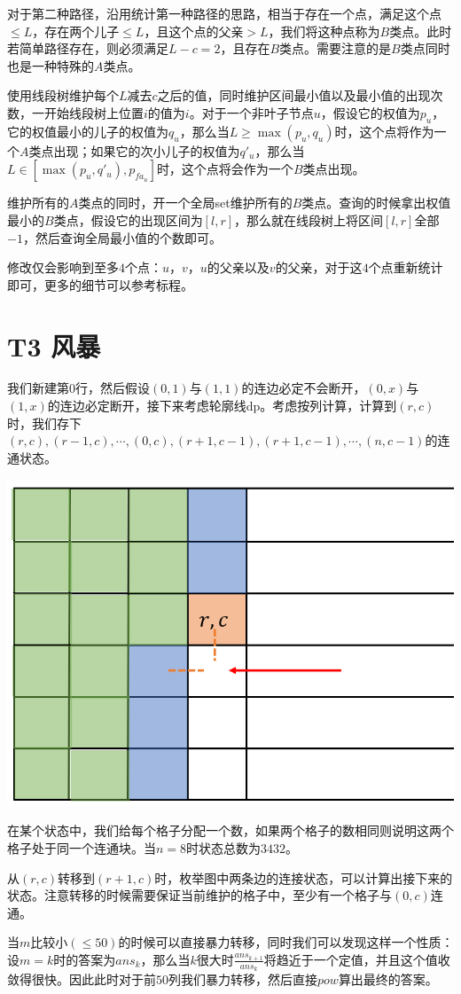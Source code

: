 \documentclass[12pt]{article}
\begin{document}
对于第二种路径，沿用统计第一种路径的思路，相当于存在一个点，满足这个点$\leq L$，存在两个儿子$\leq L$，且这个点的父亲$>L$，我们将这种点称为$B$类点。此时若简单路径存在，则必须满足$L - c = 2$，且存在$B$类点。需要注意的是$B$类点同时也是一种特殊的$A$类点。

使用线段树维护每个$L$减去$c$之后的值，同时维护区间最小值以及最小值的出现次数，一开始线段树上位置$i$的值为$i$。对于一个非叶子节点$u$，假设它的权值为$p_u$，它的权值最小的儿子的权值为$q_u$，那么当$L\geq \max(p_u, q_u)$时，这个点将作为一个$A$类点出现；如果它的次小儿子的权值为$q'_u$，那么当$L\in[\max(p_u, q'_u), p_{fa_u}]$时，这个点将会作为一个$B$类点出现。

维护所有的$A$类点的同时，开一个全局set维护所有的$B$类点。查询的时候拿出权值最小的$B$类点，假设它的出现区间为$[l, r]$，那么就在线段树上将区间$[l, r]$全部$-1$，然后查询全局最小值的个数即可。

修改仅会影响到至多$4$个点：$u$，$v$，$u$的父亲以及$v$的父亲，对于这$4$个点重新统计即可，更多的细节可以参考标程。

\newpage

\section{T3 风暴}

我们新建第$0$行，然后假设$(0, 1)$与$(1, 1)$的连边必定不会断开，$(0, x)$与$(1, x)$的连边必定断开，接下来考虑轮廓线dp。考虑按列计算，计算到$(r, c)$时，我们存下$(r, c), (r - 1, c), \cdots, (0, c), (r + 1, c - 1), (r + 1, c - 1), \cdots, (n, c - 1)$的连通状态。

\begin{center}
    \includegraphics[scale = 0.5]{1.png}
\end{center}

在某个状态中，我们给每个格子分配一个数，如果两个格子的数相同则说明这两个格子处于同一个连通块。当$n = 8$时状态总数为$3432$。\par
从$(r, c)$转移到$(r + 1, c)$时，枚举图中两条边的连接状态，可以计算出接下来的状态。注意转移的时候需要保证当前维护的格子中，至少有一个格子与$(0, c)$连通。\par
当$m$比较小$(\leq 50)$的时候可以直接暴力转移，同时我们可以发现这样一个性质：设$m = k$时的答案为$ans_k$，那么当$k$很大时$\frac{ans_{k + 1}}{ans_k}$将趋近于一个定值，并且这个值收敛得很快。因此此时对于前$50$列我们暴力转移，然后直接$pow$算出最终的答案。
\end{document}

